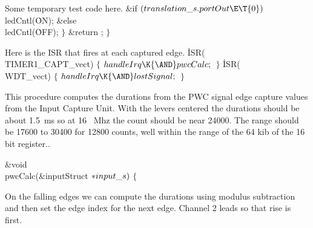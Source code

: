 Some temporary test code here.
\Y\B\&{if} ${}(\\{translation\_s}.\\{portOut}\E\T{0}){}$\1\5
\\{ledCntl}(\.{ON});\2\6
\&{else}\1\5
\\{ledCntl}(\.{OFF});\2\7
$\}{}$\7
\&{return} ;\7
$\}{}$\par
\fi

Here is the ISR that fires at each captured edge.
\Y\B\.{ISR}(\\{TIMER1\_CAPT\_vect})\1\1\2\2\6
${}\{{}$\1\7
${}\\{handleIrq}\K{\AND}\\{pwcCalc};{}$\6
\4${}\}{}$\2\7
\.{ISR}(\\{WDT\_vect})\1\1\2\2\6
${}\{{}$\1\7
${}\\{handleIrq}\K{\AND}\\{lostSignal};{}$\6
\4${}\}{}$\2\par
\fi

This procedure computes the durations from the PWC signal edge capture values
from the Input Capture Unit.
With the levers centered the durations should be about 1.5~ms so at 16~ Mhz
the count should be near 24000.
The range should be 17600 to 30400 for 12800 counts, well within the range
of the 64 kib of the 16 bit register..


\Y\B\&{void} \\{pwcCalc}(\&{inputStruct} ${}{*}\\{input\_s}){}$\1\1 $\{{}$\Y\par
\fi

On the falling edges we can compute the durations using modulus subtraction
and then set the edge index for the next edge.
Channel 2 leads so that rise is first.

